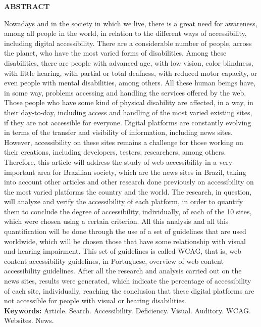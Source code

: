 \documentclass[a4paper]{article}
\begin{document}
\begin{titlepage}
	\begin{center}
		{\large \textbf{ABSTRACT}}\\[1cm]
	\end{center}
	Nowadays and in the society in which we live, there is a great need for awareness, among all people in the world, in relation to the different ways of accessibility, including digital accessibility. There are a considerable number of people, across the planet, who have the most varied forms of disabilities. Among these disabilities, there are people with advanced age, with low vision, color blindness, with little hearing, with partial or total deafness, with reduced motor capacity, or even people with mental disabilities, among others. All these human beings have, in some way, problems accessing and handling the services offered by the web. Those people who have some kind of physical disability are affected, in a way, in their day-to-day, including access and handling of the most varied existing sites, if they are not accessible for everyone. Digital platforms are constantly evolving in terms of the transfer and visibility of information, including news sites. However, accessibility on these sites remains a challenge for those working on their creations, including developers, testers, researchers, among others. Therefore, this article will address the study of web accessibility in a very important area for Brazilian society, which are the news sites in Brazil, taking into account other articles and other research done previously on accessibility on the most varied platforms the country and the world. The research, in question, will analyze and verify the accessibility of each platform, in order to quantify them to conclude the degree of accessibility, individually, of each of the 10 sites, which were chosen using a certain criterion. All this analysis and all this quantification will be done through the use of a set of guidelines that are used worldwide, which will be chosen those that have some relationship with visual and hearing impairment. This set of guidelines is called WCAG, that is, web content accessibility guidelines, in Portuguese, overview of web content accessibility guidelines. After all the research and analysis carried out on the news sites, results were generated, which indicate the percentage of accessibility of each site, individually, reaching the conclusion that these digital platforms are not accessible for people with visual or hearing disabilities.\\[1cm]
	{\large \textbf{Keywords: }}Article. Search. Accessibility. Deficiency. Visual. Auditory. WCAG. Websites. News.\\[1cm]
\end{titlepage}
\end{document}
